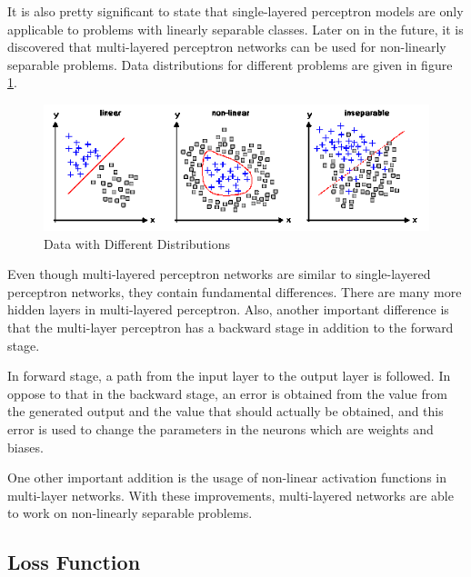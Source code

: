 It is also pretty significant to state that single-layered perceptron models are only applicable to problems with linearly separable classes. Later on in the future, it is discovered that multi-layered perceptron networks can be used for non-linearly separable problems. Data distributions for different problems are given in figure \ref{fig:data-diff-dist}.

\begin{figure}[h]
    \centering
    \includegraphics{figures/chapter3/linear-nonlinear-seperable.png}
    \caption{Data with Different Distributions\cite{sepdata}}
    \label{fig:data-diff-dist}
\end{figure}

Even though multi-layered perceptron networks are similar to single-layered perceptron networks, they contain fundamental differences. There are many more hidden layers in multi-layered perceptron. Also, another important difference is that the multi-layer perceptron has a backward stage in addition to the forward stage.

In forward stage, a path from the input layer to the output layer is followed. In oppose to that in the backward stage, an error is obtained from the value from the generated output and the value that should actually be obtained, and this error is used to change the parameters in the neurons which are weights and biases.

One other important addition is the usage of non-linear activation functions in multi-layer networks. With these improvements, multi-layered networks are able to work on non-linearly separable problems.

\subsection{Loss Function}

